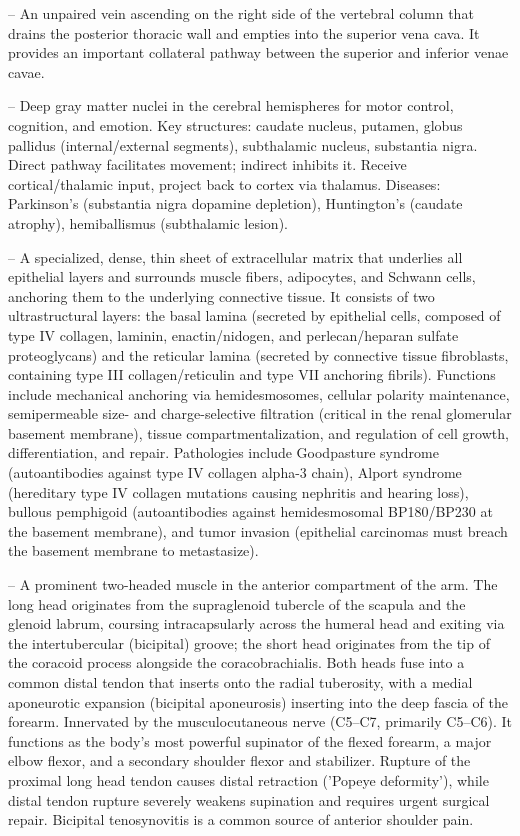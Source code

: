 -- An unpaired vein ascending on the right side of the vertebral column that drains the posterior thoracic wall and empties into the superior vena cava. It provides an important collateral pathway between the superior and inferior venae cavae.

-- Deep gray matter nuclei in the cerebral hemispheres for motor control, cognition, and emotion. Key structures: caudate nucleus, putamen, globus pallidus (internal/external segments), subthalamic nucleus, substantia nigra. Direct pathway facilitates movement; indirect inhibits it. Receive cortical/thalamic input, project back to cortex via thalamus. Diseases: Parkinson's (substantia nigra dopamine depletion), Huntington's (caudate atrophy), hemiballismus (subthalamic lesion).

-- A specialized, dense, thin sheet of extracellular matrix that underlies all epithelial layers and surrounds muscle fibers, adipocytes, and Schwann cells, anchoring them to the underlying connective tissue. It consists of two ultrastructural layers: the basal lamina (secreted by epithelial cells, composed of type IV collagen, laminin, enactin/nidogen, and perlecan/heparan sulfate proteoglycans) and the reticular lamina (secreted by connective tissue fibroblasts, containing type III collagen/reticulin and type VII anchoring fibrils). Functions include mechanical anchoring via hemidesmosomes, cellular polarity maintenance, semipermeable size- and charge-selective filtration (critical in the renal glomerular basement membrane), tissue compartmentalization, and regulation of cell growth, differentiation, and repair. Pathologies include Goodpasture syndrome (autoantibodies against type IV collagen alpha-3 chain), Alport syndrome (hereditary type IV collagen mutations causing nephritis and hearing loss), bullous pemphigoid (autoantibodies against hemidesmosomal BP180/BP230 at the basement membrane), and tumor invasion (epithelial carcinomas must breach the basement membrane to metastasize).

-- A prominent two-headed muscle in the anterior compartment of the arm. The long head originates from the supraglenoid tubercle of the scapula and the glenoid labrum, coursing intracapsularly across the humeral head and exiting via the intertubercular (bicipital) groove; the short head originates from the tip of the coracoid process alongside the coracobrachialis. Both heads fuse into a common distal tendon that inserts onto the radial tuberosity, with a medial aponeurotic expansion (bicipital aponeurosis) inserting into the deep fascia of the forearm. Innervated by the musculocutaneous nerve (C5--C7, primarily C5--C6). It functions as the body's most powerful supinator of the flexed forearm, a major elbow flexor, and a secondary shoulder flexor and stabilizer. Rupture of the proximal long head tendon causes distal retraction ('Popeye deformity'), while distal tendon rupture severely weakens supination and requires urgent surgical repair. Bicipital tenosynovitis is a common source of anterior shoulder pain.

